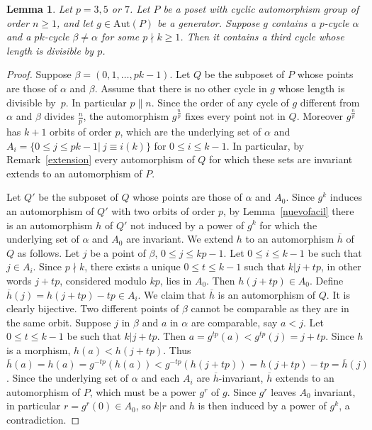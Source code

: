 \documentclass[10pt,a4paper]{amsart}
\renewcommand{\varphi}{h}
\newcommand{\aut}{\textrm{Aut}}
\theoremstyle{plain}
\newtheorem{lema}[cdrthm]{Lemma}
\theoremstyle{definition}
\theoremstyle{remark}
\begin{document}
\begin{lema} \label{lema357}
Let $p=3,5$ or $7$. Let $P$ be a poset with cyclic automorphism group of order $n\ge 1$, and let $g\in \aut(P)$ be a generator. Suppose $g$ contains a $p$-cycle $\alpha$ and a $pk$-cycle $\beta\neq \alpha$ for some $p\nmid k\ge 1$. Then it contains a third cycle whose length is divisible by $p$.
\end{lema}

\begin{proof}
Suppose $\beta=(0,1,\ldots, pk-1)$. Let $Q$ be the subposet of $P$ whose points are those of $\alpha$ and $\beta$. Assume that there is no other cycle in $g$ whose length is divisible by~$p$. In particular $p\parallel n$. Since the order of any cycle of $g$ different from $\alpha$ and $\beta$ divides $\frac{n}{p}$, the automorphism $g^{\frac{n}{p}}$ fixes every point not in $Q$. Moreover $g^{\frac{n}{p}}$ has $k+1$ orbits of order $p$, which are the underlying set of $\alpha$ and $A_i=\{0\le j\le pk-1 | \ j\equiv i (k)\}$ for $0\le i\le k-1$. In particular, by Remark~\ref{extension} every automorphism of $Q$ for which these sets are invariant extends to an automorphism of $P$.

Let $Q'$ be the subposet of $Q$ whose points are those of $\alpha$ and $A_0$. Since $g^{k}$ induces an automorphism of $Q'$ with two orbits of order $p$, by Lemma~\ref{nuevofacil} there is an automorphism $\varphi$ of $Q'$ not induced by a power of $g^{k}$ for which the underlying set of $\alpha$ and $A_0$ are invariant. We extend $\varphi$ to an automorphism $\overline{\varphi}$ of $Q$ as follows. Let $j$ be a point of $\beta$, $0\le j\le kp-1$. Let $0\le i\le k-1$ be such that $j\in A_i$. Since $p\nmid k$, there exists a unique  $0\le t\le k-1$ such that $k|j+tp$, in other words $j+tp$, considered modulo $kp$, lies in $A_0$. Then $\varphi(j+tp)\in A_0$. Define $\overline{\varphi}(j)=\varphi(j+tp)-tp\in A_i$. We claim that $\overline{\varphi}$ is an automorphism of $Q$. It is clearly bijective. Two different points of $\beta$ cannot be comparable as they are in the same orbit. Suppose $j$ in $\beta$ and $a$ in $\alpha$ are comparable, say $a<j$. Let $0\le t\le k-1$ be such that $k|j+tp$. Then $a=g^{tp}(a)<g^{tp}(j)=j+tp$. Since $\varphi$ is a morphism, $\varphi(a)<\varphi(j+tp)$. Thus $\overline{\varphi}(a)=\varphi (a)=g^{-tp}(\varphi(a))<g^{-tp} (\varphi(j+tp))=\varphi(j+tp)-tp=\overline{\varphi}(j)$. Since the underlying set of $\alpha$ and each $A_i$ are $\overline{\varphi}$-invariant, $\overline{\varphi}$ extends to an automorphism of $P$, which must be a power $g^r$ of $g$. Since $g^r$ leaves $A_0$ invariant, in particular $r=g^r(0)\in A_0$, so $k|r$ and $\varphi$ is then induced by a power of $g^k$, a contradiction.   
\end{proof}
\end{document}
